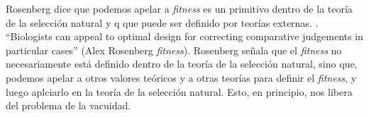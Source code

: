 Rosenberg dice que podemos apelar a \emph{fitness} es un primitivo dentro de la teoría de la selección natural y q  que puede ser definido por teorías externas. . ``Biologists can appeal to optimal design for correcting comparative judgements in particular cases'' (Alex Rosenberg \emph{fitness}). Rosenberg señala que el \emph{fitness} no necesariamente está definido dentro de la teoría de la selección natural, sino que, podemos apelar a otros valores teóricos y a otras teorías para definir el \emph{fitness}, y luego aplciarlo en la teoría de la selección natural. Esto, en principio, nos libera del problema de la vacuidad.







